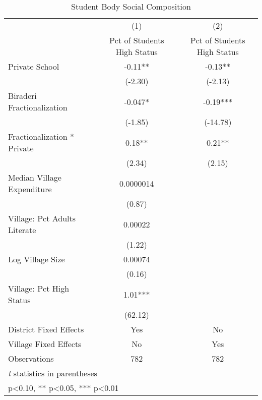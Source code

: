 \begin{table}[htbp]\centering
\def\sym#1{\ifmmode^{#1}\else\(^{#1}\)\fi}
\caption{Student Body Social Composition\label{highpooling}}
\begin{tabular}{l*{2}{c}}
\toprule
                &\multicolumn{1}{c}{(1)}&\multicolumn{1}{c}{(2)}\\
                &\multicolumn{1}{c}{Pct of Students High Status}&\multicolumn{1}{c}{Pct of Students High Status}\\
\midrule
Private School  &    -0.11** &    -0.13** \\
                &  (-2.30)   &  (-2.13)   \\
Biraderi Fractionalization&   -0.047*  &    -0.19***\\
                &  (-1.85)   & (-14.78)   \\
Fractionalization * Private&     0.18** &     0.21** \\
                &   (2.34)   &   (2.15)   \\
Median Village Expenditure&0.0000014   &            \\
                &   (0.87)   &            \\
Village: Pct Adults Literate&  0.00022   &            \\
                &   (1.22)   &            \\
Log Village Size&  0.00074   &            \\
                &   (0.16)   &            \\
Village: Pct High Status&     1.01***&            \\
                &  (62.12)   &            \\
District Fixed Effects&      Yes   &       No   \\
Village Fixed Effects&       No   &      Yes   \\
\midrule
Observations    &      782   &      782   \\
\bottomrule
\multicolumn{3}{l}{\footnotesize \textit{t} statistics in parentheses}\\
\multicolumn{3}{l}{\footnotesize * p<0.10, ** p<0.05, *** p<0.01}\\
\end{tabular}
\end{table}
